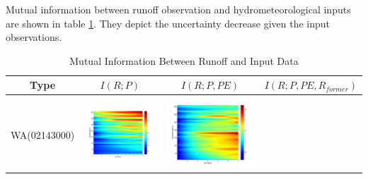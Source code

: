 \documentclass[11pt]{article}
\begin{document}
Mutual information between runoff observation and hydrometeorological inputs are shown in table \ref{MI}. They depict the uncertainty decrease given the input observations. 
\begin{table}[H]\small 
\caption{Mutual Information Between Runoff and Input Data}
\label{MI}
\resizebox{\textwidth}{!}
{
\centering
\begin{tabular}{cccc}
\toprule
Type&$I(R;P)$&$I(R;P,PE)$&$I(R;P,PE,R_{former})$\\\hline
\\
WA(02143000)
&\begin{minipage}{.3\textwidth}\includegraphics[width=\linewidth]{resultgraph/02143000p.png}\end{minipage}
&\begin{minipage}{.3\textwidth}\includegraphics[width=\linewidth]{resultgraph/02143000pep.png}\end{minipage}

\end{tabular}}
\end{table}
\end{document}
